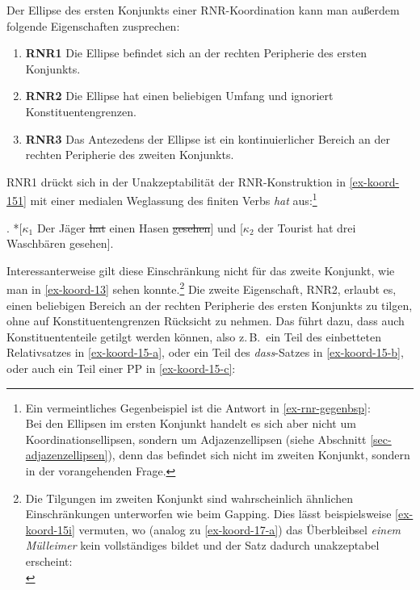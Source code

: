 Der Ellipse des ersten Konjunkts einer RNR-Koordination kann man au\ss erdem folgende Eigenschaften zusprechen:
\begin{enumerate}
  \item[] {\bf RNR1} Die Ellipse befindet sich an der rechten Peripherie des ersten Konjunkts.
  \item[] {\bf RNR2} Die Ellipse hat einen beliebigen Umfang und ignoriert Konstituentengrenzen.
  \item[] {\bf RNR3} Das Antezedens der Ellipse ist ein kontinuierlicher Bereich an der rechten Peripherie des zweiten Konjunkts.  
\end{enumerate}
RNR1 drückt sich in der Unakzeptabilität der RNR-Konstruktion in \ref{ex-koord-151} mit einer medialen Weglassung des finiten Verbs {\it hat} aus:\footnote{Ein vermeintliches Gegenbeispiel ist die Antwort in \ref{ex-rnr-gegenbsp}:\\
Bei den Ellipsen im ersten Konjunkt handelt es sich aber nicht um Koordinationsellipsen, sondern um Adjazenzellipsen (siehe Abschnitt \ref{sec-adjazenzellipsen}), denn das  befindet sich nicht im zweiten Konjunkt, sondern in der vorangehenden Frage.}

\ex. *[$\kappa_1$ Der Jäger \sout{hat} einen Hasen \sout{gesehen}] und [$\kappa_2$ der Tourist hat drei Waschbären gesehen].\label{ex-koord-151}

Interessanterweise gilt diese Einschränkung nicht für das zweite Konjunkt, wie man in \ref{ex-koord-13} sehen konnte.\footnote{Die Tilgungen im zweiten Konjunkt sind wahrscheinlich ähnlichen Einschränkungen unterworfen wie beim Gapping. Dies lässt beispielsweise \ref{ex-koord-15i} vermuten, wo (analog zu \ref{ex-koord-17-a}) das Überbleibsel {\it einem Mülleimer} kein vollständiges  bildet und der Satz dadurch unakzeptabel erscheint:\\  
\fnex{
\ex. *\label{ex-koord-15i}[$\kappa_1$ Hinter einer Mülltonne hat sich Karl \sout{versteckt} und [$\kappa_2$ \sout{hinter} einem Mülleimer \sout{hat sich} Peter versteckt].

}} Die zweite Eigenschaft, RNR2, erlaubt es, einen beliebigen Bereich an der rechten Peripherie des ersten Konjunkts zu tilgen, ohne auf Konstituentengrenzen Rücksicht zu nehmen. Das führt dazu, dass auch Konstituententeile getilgt werden können, also z.\,B.\  ein Teil des einbetteten Relativsatzes in \ref{ex-koord-15-a}, oder ein Teil des \emph{dass}-Satzes in \ref{ex-koord-15-b}, oder auch ein Teil einer PP in \ref{ex-koord-15-c}:  


